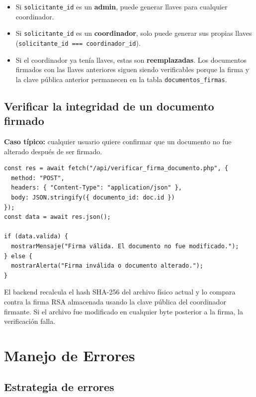 \documentclass[10pt,letterpaper]{report}
\begin{document}
\begin{itemize}
  \item Si \texttt{solicitante\_id} es un \textbf{admin}, puede generar llaves para cualquier coordinador.
  \item Si \texttt{solicitante\_id} es un \textbf{coordinador}, solo puede generar sus propias llaves (\texttt{solicitante\_id === coordinador\_id}).
  \item Si el coordinador ya tenía llaves, estas son \textbf{reemplazadas}. Los documentos firmados con las llaves anteriores siguen siendo verificables porque la firma y la clave pública anterior permanecen en la tabla \texttt{documentos\_firmas}.
\end{itemize}

\section{Verificar la integridad de un documento firmado}

\textbf{Caso típico:} cualquier usuario quiere confirmar que un documento no fue alterado después de ser firmado.

\begin{lstlisting}[style=jsstyle, caption={Verificación de firma RSA/SHA-256 desde el frontend (elaboración propia).}]
const res = await fetch("/api/verificar_firma_documento.php", {
  method: "POST",
  headers: { "Content-Type": "application/json" },
  body: JSON.stringify({ documento_id: doc.id })
});
const data = await res.json();

if (data.valida) {
  mostrarMensaje("Firma válida. El documento no fue modificado.");
} else {
  mostrarAlerta("Firma inválida o documento alterado.");
}
\end{lstlisting}

El backend recalcula el hash SHA-256 del archivo físico actual y lo compara contra la firma RSA almacenada usando la clave pública del coordinador firmante. Si el archivo fue modificado en cualquier byte posterior a la firma, la verificación falla.

\chapter{Manejo de Errores}

\section{Estrategia de errores}
\end{document}
